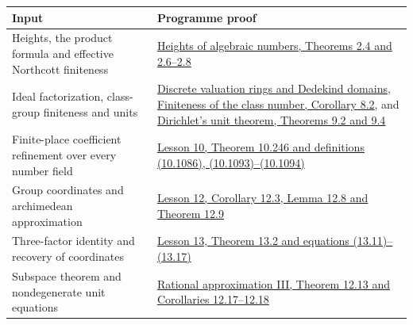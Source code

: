 \documentclass[
  11pt,
  a4paper,
]{article}
\newcounter{none} %
\begin{document}
{\def\LTcaptype{none} %
\begin{longtable}[]{@{}
  >{\raggedright\arraybackslash}p{}
  >{\raggedright\arraybackslash}p{}@{}}
\toprule\noalign{}
\begin{minipage}[b]{\linewidth}\raggedright
Input
\end{minipage} & \begin{minipage}[b]{\linewidth}\raggedright
Programme proof
\end{minipage} \\
\midrule\noalign{}
\endhead
\bottomrule\noalign{}
\endlastfoot
Heights, the product formula and effective Northcott finiteness &
\href{https://kokunoyumeto.github.io/open-math-courses-public/courses/TR-TRANS/TR-TRANS-02.html}{Heights of algebraic numbers,
Theorems 2.4 and 2.6--2.8} \\
Ideal factorization, class-group finiteness and units &
\href{https://kokunoyumeto.github.io/open-math-courses-public/courses/NT-ANT/discrete-valuation-rings-and-dedekind-domains.html}{Discrete
valuation rings and Dedekind domains},
\href{https://kokunoyumeto.github.io/open-math-courses-public/courses/NT-ANT/finiteness-of-the-class-number.html}{Finiteness of
the class number, Corollary 8.2}, and
\href{https://kokunoyumeto.github.io/open-math-courses-public/courses/NT-ANT/dirichlets-unit-theorem.html}{Dirichlet's unit
theorem, Theorems 9.2 and 9.4} \\
Finite-place coefficient refinement over every number field &
\href{https://kokunoyumeto.github.io/open-math-courses-public/courses/TR-BAKER/TR-BAKER-10.html}{Lesson 10, Theorem 10.246 and definitions
(10.1086), (10.1093)--(10.1094)} \\
Group coordinates and archimedean approximation &
\href{https://kokunoyumeto.github.io/open-math-courses-public/courses/TR-BAKER/TR-BAKER-12.html}{Lesson 12, Corollary 12.3, Lemma 12.8 and
Theorem 12.9} \\
Three-factor identity and recovery of coordinates &
\href{https://kokunoyumeto.github.io/open-math-courses-public/courses/TR-BAKER/TR-BAKER-13.html}{Lesson 13, Theorem 13.2 and equations
(13.11)--(13.17)} \\
Subspace theorem and nondegenerate unit equations &
\href{https://kokunoyumeto.github.io/open-math-courses-public/courses/TR-TRANS/TR-TRANS-12.html}{Rational approximation III,
Theorem 12.13 and Corollaries 12.17--12.18} \\
\end{longtable}
}
\end{document}
